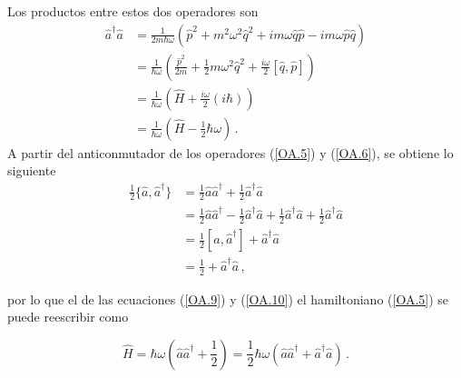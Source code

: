 Los productos entre estos dos operadores son
\begin{align}
  \hat{a}^{\dagger}\hat{a} & = \frac{1}{2m\hbar\omega} \left( \hat{p}^2 + m^2\omega^2\hat{q}^2 + im\omega\hat{q}\hat{p} - im\omega\hat{p}\hat{q} \right) \nonumber \\
                           & = \frac{1}{\hbar\omega}\left( \frac{\hat{p}^2}{2m} + \frac{1}{2}m\omega^2\hat{q}^2 +\frac{i\omega}{2} [\hat{q}, \hat{p}] \right)
  \nonumber                                                                                                                                                        \\
                           & = \frac{1}{\hbar\omega} \left( \hat{H} + \frac{i\omega}{2}(i\hbar) \right) \nonumber                                                  \\
                           & = \frac{1}{\hbar\omega} \left( \hat{H} - \frac{1}{2}\hbar\omega \right) \label{OA.9}\,.
\end{align}
A partir del anticonmutador de los operadores (\ref{OA.5}) y (\ref{OA.6}), se obtiene lo siguiente
\begin{align}
  \frac{1}{2}\{ \hat{a},\hat{a}^{\dagger}\} & = \frac{1}{2}\hat{a}\hat{a}^{\dagger} + \frac{1}{2}\hat{a}^{\dagger}\hat{a}                                                \nonumber                             \\
                                            & = \frac{1}{2}\hat{a}\hat{a}^{\dagger} - \frac{1}{2}\hat{a}^{\dagger}\hat{a} +\frac{1}{2}\hat{a}^{\dagger}\hat{a} + \frac{1}{2}\hat{a}^{\dagger}\hat{a} \nonumber \\
                                            & = \frac{1}{2}[\hat{a},\hat{a}^{\dagger}] + \hat{a}^{\dagger}\hat{a}                                                        \nonumber                             \\
                                            & = \frac{1}{2} + \hat{a}^{\dagger}\hat{a} \label{OA.10}\,,
\end{align}

por lo que el de las ecuaciones (\ref{OA.9}) y (\ref{OA.10}) el hamiltoniano (\ref{OA.5}) se puede reescribir como

\begin{equation}
  \label{OA.11}
  \hat{H} = \hbar \omega \left(\hat{a} \hat{a}^{\dagger} + \frac{1}{2}\right) = \frac{1}{2}\hbar \omega \left( \hat{a}\hat{a}^{\dagger} + \hat{a}^{\dagger}\hat{a} \right) \,.
\end{equation}

